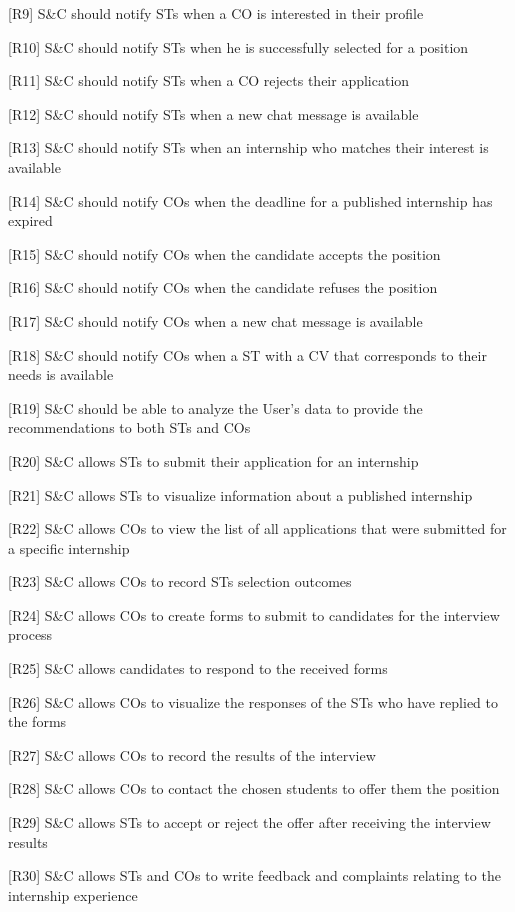 [R9] S\&C should notify STs when a CO is interested in their profile

[R10] S\&C should notify STs when he is successfully selected for a position

[R11] S\&C should notify STs when a CO rejects their application

[R12] S\&C should notify STs when a new chat message is available

[R13] S\&C should notify STs when an internship who matches their interest is available

[R14] S\&C should notify COs when the deadline for a published internship has expired

[R15] S\&C should notify COs when the candidate accepts the position

[R16] S\&C should notify COs when the candidate refuses the position

[R17] S\&C should notify COs when a new chat message is available

[R18] S\&C should notify COs when a ST with a CV that corresponds to their needs is available

[R19] S\&C should be able to analyze the User’s data to provide the recommendations to both STs and COs

[R20] S\&C allows STs to submit their application for an internship	

[R21] S\&C allows STs to visualize information about a published internship

[R22] S\&C allows COs to view the list of all applications that were submitted for a specific internship

[R23] S\&C allows COs to record STs selection outcomes

[R24] S\&C allows COs to create forms to submit to candidates for the interview process

[R25] S\&C allows candidates to respond to the received forms

[R26] S\&C allows COs to visualize the responses of the STs who have replied to the forms

[R27] S\&C allows COs to record the results of the interview

[R28] S\&C allows COs to contact the chosen students to offer them the position

[R29] S\&C allows STs to accept or reject the offer after receiving the interview results

[R30] S\&C allows STs and COs to write feedback and complaints relating to the internship experience

